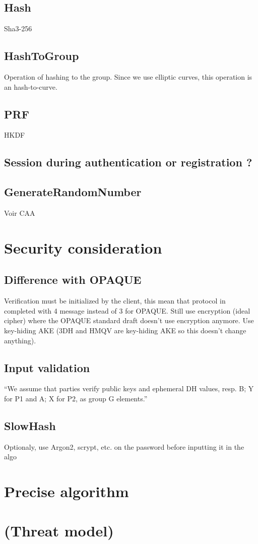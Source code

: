 \documentclass[../report.tex]{subfiles}
\begin{document}
\subsection{Hash}
Sha3-256

\subsection{HashToGroup}
Operation of hashing to the group. Since we use elliptic curves, this operation is an hash-to-curve.


\subsection{PRF}
HKDF

\subsection{Session during authentication or registration ?}


\subsection{GenerateRandomNumber}
Voir CAA





\section{Security consideration}

\subsection{Difference with OPAQUE} %

Verification must be initialized by the client, this mean that protocol in completed with 4 message instead of 3 for OPAQUE.
Still use encryption (ideal cipher) where the OPAQUE standard draft doesn't use encryption anymore.
Use key-hiding AKE (3DH and HMQV are key-hiding AKE so this doesn't change anything).

\subsection{Input validation}
``We assume that parties verify public keys and ephemeral DH values, resp.
B; Y for P1 and A; X for P2, as group G elements.''

\subsection{SlowHash}
Optionaly, use Argon2, scrypt, etc. on the password before inputting it in the algo


\section{Precise algorithm}

\section{(Threat model)}
\end{document}
